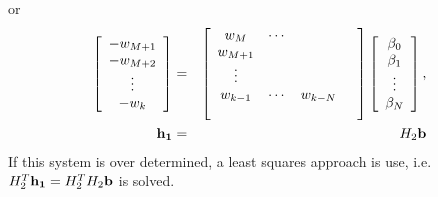 \documentclass[10pt]{amsart}
\begin{document}
or
\begin{eqnarray}
	\left[\begin{array}{c}-w_{M+1} \\ -w_{M+2} \\ \vdots \\ -w_{k} \end{array}\right] &=&
	\left[\begin{array}{cccc} w_{M} & \cdots &   \\ w_{M+1} &   &   \\\vdots &   &   &   \\w_{k-1} & \cdots & w_{k-N} \\  &   &   &  \end{array}\right]
	\left[\begin{array}{c}\beta_0 \\\beta_1 \\\vdots \\\beta_N\end{array}\right], \nonumber \\
	{\bf h_1} & = & H_2 {\bf b}
	\label{eq:Prony_beta}
\end{eqnarray}
If this system is over determined, a least squares approach is use, i.e. $H_2^T {\bf h_1} = H_2^T H_2 {\bf b}$ is solved.

\end{document}
